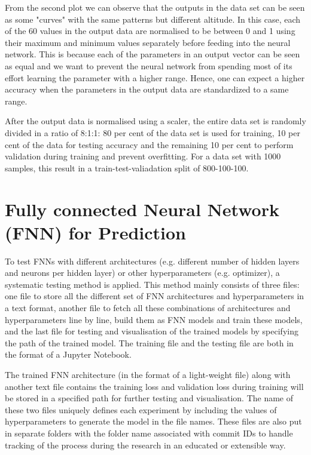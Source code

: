 From the second plot we can observe that the outputs in the data set can be seen as some "curves" with the same patterns but different altitude. In this case, each of the 60 values in the output data are normalised to be between 0 and 1 using their maximum and minimum values separately before feeding into the neural network. This is because each of the parameters in an output vector can be seen as equal and we want to prevent the neural network from spending most of its effort learning the parameter with a higher range. Hence, one can expect a higher accuracy when the parameters in the output data are standardized to a same range.

After the output data is normalised using a scaler, the entire data set is randomly divided in a ratio of 8:1:1: 80 per cent of the data set is used for training, 10 per cent of the data for testing accuracy and the remaining 10 per cent to perform validation during training and prevent overfitting. For a data set with 1000 samples, this result in a train-test-valiadation split of 800-100-100.


\section{Fully connected Neural Network (FNN) for Prediction}

To test FNNs with different architectures (e.g. different number of hidden layers and neurons per hidden layer) or other hyperparameters (e.g. optimizer), a systematic testing method is applied. This method mainly consists of three files: one file to store all the different set of FNN architectures and hyperparameters in a text format, another file to fetch all these combinations of architectures and hyperparameters line by line, build them as FNN models and train these models, and the last file for testing and visualisation of the trained models by specifying the path of the trained model. The training file and the testing file are both in the format of a Jupyter Notebook.

The trained FNN architecture (in the format of a light-weight file) along with another text file contains the training loss and validation loss during training will be stored in a specified path for further testing and visualisation. The name of these two files uniquely defines each experiment by including the values of hyperparameters to generate the model in the file names. These files are also put in separate folders with the folder name associated with commit IDs to handle tracking of the process during the research in an educated or extensible way.

